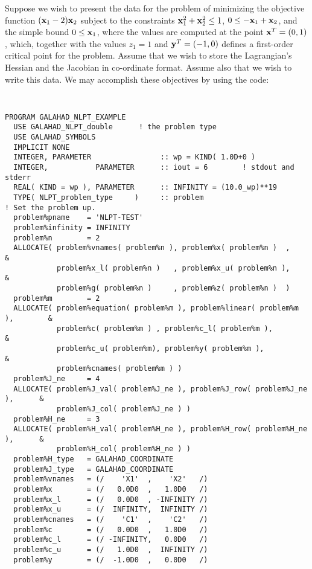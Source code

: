 \documentclass{galahad}
\begin{document}

\galexample
Suppose we wish to present the data for the problem of minimizing
the objective function
$({\mathbf{x}}_1 - 2 ) {\mathbf{x}}_2$
subject to the constraints
${\mathbf{x}}_1^2 +{\mathbf{x}}_2^2 \leq 1$,
$0 \leq -{\mathbf{x}}_1 + {\mathbf{x}}_2 $, and the simple bound
$0 \leq  {\mathbf{x}}_1$, where the values are computed at the point
${\mathbf{x}}^T = (0,1)$, which, together with the values $z_1 = 1$
and ${\mathbf{y}}^T = ( -1, 0 )$ defines a first-order critical point for the problem.
Assume that we wish to store the Lagrangian's Hessian and the Jacobian in
co-ordinate format. Assume also that we wish to write this data.  We may
accomplish these objectives by using the code:
{\tt \small
\begin{verbatim}
PROGRAM GALAHAD_NLPT_EXAMPLE
  USE GALAHAD_NLPT_double      ! the problem type
  USE GALAHAD_SYMBOLS
  IMPLICIT NONE
  INTEGER, PARAMETER                :: wp = KIND( 1.0D+0 )
  INTEGER,           PARAMETER      :: iout = 6        ! stdout and stderr
  REAL( KIND = wp ), PARAMETER      :: INFINITY = (10.0_wp)**19
  TYPE( NLPT_problem_type     )     :: problem
! Set the problem up.
  problem%pname    = 'NLPT-TEST'
  problem%infinity = INFINITY
  problem%n        = 2
  ALLOCATE( problem%vnames( problem%n ), problem%x( problem%n )  ,             &
            problem%x_l( problem%n )   , problem%x_u( problem%n ),             &
            problem%g( problem%n )     , problem%z( problem%n )  )
  problem%m        = 2
  ALLOCATE( problem%equation( problem%m ), problem%linear( problem%m ),        &
            problem%c( problem%m ) , problem%c_l( problem%m ),                 &
            problem%c_u( problem%m), problem%y( problem%m ),                   &
            problem%cnames( problem%m ) )
  problem%J_ne     = 4
  ALLOCATE( problem%J_val( problem%J_ne ), problem%J_row( problem%J_ne ),      &
            problem%J_col( problem%J_ne ) )
  problem%H_ne     = 3
  ALLOCATE( problem%H_val( problem%H_ne ), problem%H_row( problem%H_ne ),      &
            problem%H_col( problem%H_ne ) )
  problem%H_type   = GALAHAD_COORDINATE
  problem%J_type   = GALAHAD_COORDINATE
  problem%vnames   = (/    'X1'  ,    'X2'   /)
  problem%x        = (/   0.0D0  ,   1.0D0   /)
  problem%x_l      = (/   0.0D0  , -INFINITY /)
  problem%x_u      = (/  INFINITY,  INFINITY /)
  problem%cnames   = (/    'C1'  ,    'C2'   /)
  problem%c        = (/   0.0D0  ,   1.0D0   /)
  problem%c_l      = (/ -INFINITY,   0.0D0   /)
  problem%c_u      = (/   1.0D0  ,  INFINITY /)
  problem%y        = (/  -1.0D0  ,   0.0D0   /)

\end{verbatim}}
\end{document}

